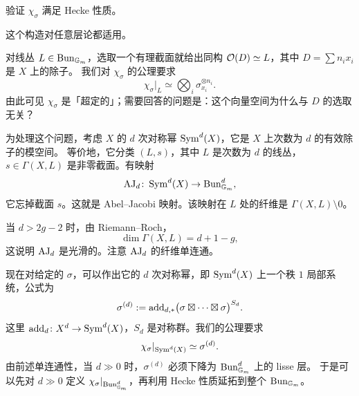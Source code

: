 \begin{exercise}\label{ex:gl1-hecke}
验证 \(\chi_\sigma\) 满足 Hecke 性质。
\end{exercise}

\begin{construction}[Deligne]\label{con:gl1-deligne}
这个构造对任意层论都适用。

对线丛 \(L\in\operatorname{Bun}_{\mathbb{G}_m}\)，选取一个有理截面就给出同构 \(\mathcal{O}(D)\simeq L\)，其中 \(D=\sum n_i x_i\) 是 \(X\) 上的除子。
我们对 \(\chi_\sigma\) 的公理要求
\[
\chi_\sigma|_L\simeq\bigotimes_i\sigma_{x_i}^{\otimes n_i}.
\]
由此可见 \(\chi_\sigma\) 是「超定的」；需要回答的问题是：这个向量空间为什么与 \(D\) 的选取无关？

为处理这个问题，考虑 \(X\) 的 \(d\) 次对称幂 \(\operatorname{Sym}^d(X)\)，它是 \(X\) 上次数为 \(d\) 的有效除子的模空间。
等价地，它分类 \((L,s)\)，其中 \(L\) 是次数为 \(d\) 的线丛，\(s\in\Gamma(X,L)\) 是非零截面。有映射
\[
\operatorname{AJ}_d\colon\operatorname{Sym}^d(X)\to\operatorname{Bun}^d_{\mathbb{G}_m},
\]
它忘掉截面 \(s\)。这就是 Abel--Jacobi 映射。该映射在 \(L\) 处的纤维是 \(\Gamma(X,L)\setminus 0\)。

当 \(d>2g-2\) 时，由 Riemann--Roch，
\[
\dim\Gamma(X,L)=d+1-g,
\]
这说明 \(\operatorname{AJ}_d\) 是光滑的。注意 \(\operatorname{AJ}_d\) 的纤维单连通。

现在对给定的 \(\sigma\)，可以作出它的 \(d\) 次对称幂，即 \(\operatorname{Sym}^d(X)\) 上一个秩 \(1\) 局部系统，公式为
\begin{equation}\label{eq:1.2}
\sigma^{(d)}:=\operatorname{add}_{d,*}\bigl(\sigma\boxtimes\cdots\boxtimes\sigma\bigr)^{S_d}.
\end{equation}
这里 \(\operatorname{add}_d\colon X^d\to\operatorname{Sym}^d(X)\)，\(S_d\) 是对称群。我们的公理要求
\[
\chi_\sigma|_{\operatorname{Sym}^d(X)}\simeq\sigma^{(d)}.
\]
由前述单连通性，当 \(d\gg 0\) 时，\(\sigma^{(d)}\) 必须下降为 \(\operatorname{Bun}^d_{\mathbb{G}_m}\) 上的 lisse 层。
于是可以先对 \(d\gg 0\) 定义 \(\chi_\sigma|_{\operatorname{Bun}^d_{\mathbb{G}_m}}\)，再利用 Hecke 性质延拓到整个 \(\operatorname{Bun}_{\mathbb{G}_m}\)。
\end{construction}

